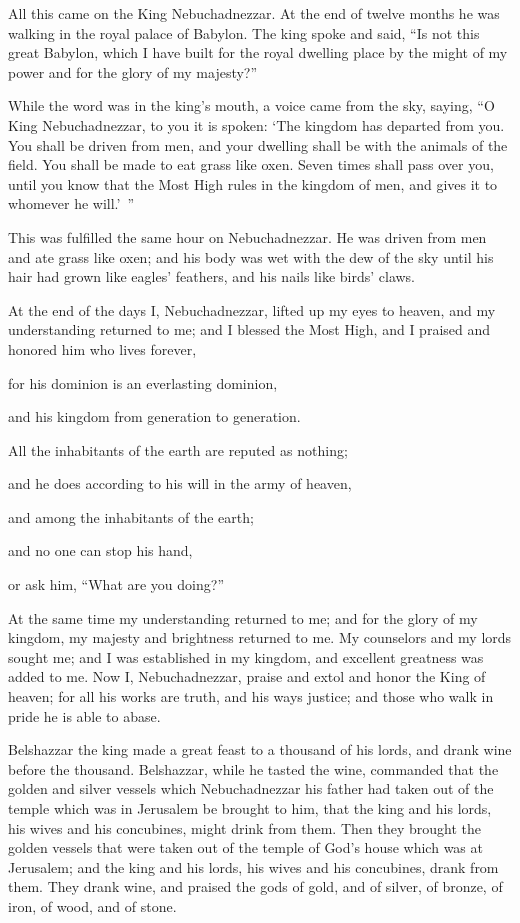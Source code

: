 \myverse{}All this came on the King Nebuchadnezzar.
\myverse{}At the end of twelve months he was walking in the royal palace of Babylon.
\myverse{}The king spoke and said, “Is not this great Babylon, which I have built for
the royal dwelling place by the might of my power and for the glory of my majesty?”

\myverse{}While the word was in the king’s mouth, a voice came
from the sky, saying, “O King Nebuchadnezzar, to you it is spoken: ‘The kingdom has departed from you.
\myverse{}You shall be driven from men, and your dwelling shall be with the animals
of the field. You shall be made to eat grass like oxen. Seven times shall pass over you, until you know
that the Most High rules in the kingdom of men, and gives it to whomever he will.’ ”

\myverse{}This was fulfilled the same hour on Nebuchadnezzar.
He was driven from men and ate grass like oxen; and his body was wet with the dew of the sky until his
hair had grown like eagles’ feathers, and his nails like birds’ claws.

\myverse{}At the end of the days I, Nebuchadnezzar, lifted up
my eyes to heaven, and my understanding returned to me; and I blessed the Most High, and I praised and
honored him who lives forever,

for his dominion is an everlasting dominion,

and his kingdom from generation to generation.

\myverse{}All the inhabitants of the earth are reputed as nothing;

and he does according to his will in the army of heaven,

and among the inhabitants of the earth;

and no one can stop his hand,

or ask him, “What are you doing?”

\myverse{}At the same time my understanding returned to me;
and for the glory of my kingdom, my majesty and brightness returned to me. My counselors and my lords
sought me; and I was established in my kingdom, and excellent greatness was added to me.
\myverse{}Now I, Nebuchadnezzar, praise and extol and honor the King of heaven; for
all his works are truth, and his ways justice; and those who walk in pride he is able to abase.


\mychapter{} \myverse*{}Belshazzar the king made a great feast to a thousand of his lords,
and drank wine before the thousand.
\myverse{}Belshazzar, while he tasted the wine, commanded that the golden and silver vessels
which Nebuchadnezzar his father had taken out of the temple which was in Jerusalem be brought to him,
that the king and his lords, his wives and his concubines, might drink from them.
\myverse{}Then they brought the golden vessels that were taken out of the temple of God’s
house which was at Jerusalem; and the king and his lords, his wives and his concubines, drank from them.
\myverse{}They drank wine, and praised the gods of gold, and of silver, of bronze, of
iron, of wood, and of stone.

